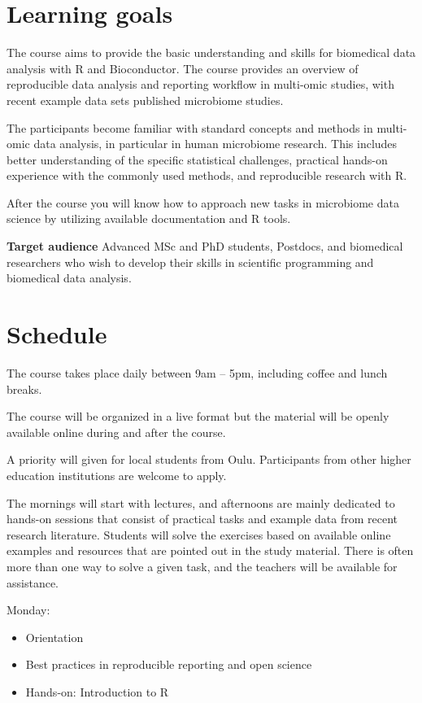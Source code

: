 \documentclass[
  oneside]{book}
\providecommand{\tightlist}{%
  \setlength{\itemsep}{0pt}\setlength{\parskip}{0pt}}
\begin{document}
\hypertarget{learning-goals}{%
\section{Learning goals}\label{learning-goals}}

The course aims to provide the basic understanding and skills for
biomedical data analysis with R and Bioconductor. The course provides
an overview of reproducible data analysis and reporting workflow in
multi-omic studies, with recent example data sets published microbiome
studies.

The participants become familiar with standard concepts and methods in
multi-omic data analysis, in particular in human microbiome research.
This includes better understanding of the specific statistical
challenges, practical hands-on experience with the commonly used
methods, and reproducible research with R.

After the course you will know how to approach new tasks in microbiome
data science by utilizing available documentation and R tools.

\textbf{Target audience} Advanced MSc and PhD students, Postdocs, and
biomedical researchers who wish to develop their skills in
scientific programming and biomedical data analysis.

\hypertarget{schedule}{%
\section{Schedule}\label{schedule}}

The course takes place daily between 9am -- 5pm, including coffee and
lunch breaks.

The course will be organized in a live format but the material will be
openly available online during and after the course.

A priority will given for local students from Oulu. Participants from
other higher education institutions are welcome to apply.

The mornings will start with lectures, and afternoons are mainly
dedicated to hands-on sessions that consist of practical tasks and
example data from recent research literature. Students will solve the
exercises based on available online examples and resources that are
pointed out in the study material. There is often more than one way to
solve a given task, and the teachers will be available for assistance.

Monday:

\begin{itemize}
\tightlist
\item
  Orientation
\item
  Best practices in reproducible reporting and open science
\item
  Hands-on: Introduction to R
\end{itemize}
\end{document}
